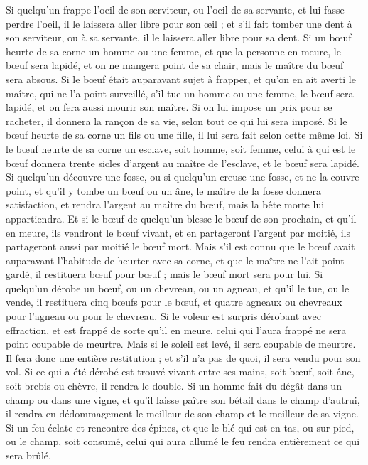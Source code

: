 \begin{multicols}{2}
Si quelqu'un frappe l'oeil de son serviteur, ou l'oeil de sa servante, et lui fasse perdre l'oeil, il le laissera aller libre pour son œil ;
et s'il fait tomber une dent à son serviteur, ou à sa servante, il le laissera aller libre pour sa dent.
Si un bœuf heurte de sa corne un homme ou une femme, et que la personne en meure, le bœuf sera lapidé, et on ne mangera point de sa chair, mais le maître du bœuf sera absous.
Si le bœuf était auparavant sujet à frapper, et qu’on en ait averti le maître, qui ne l'a point surveillé, s'il tue un homme ou une femme, le bœuf sera lapidé, et on fera aussi mourir son maître.
Si on lui impose un prix pour se racheter, il donnera la rançon de sa vie, selon tout ce qui lui sera imposé.
Si le bœuf heurte de sa corne un fils ou une fille, il lui sera fait selon cette même loi.
Si le bœuf heurte de sa corne un esclave, soit homme, soit femme, celui à qui est le bœuf donnera trente sicles d'argent au maître de l'esclave, et le bœuf sera lapidé.
Si quelqu'un découvre une fosse, ou si quelqu'un creuse une fosse, et ne la couvre point, et qu'il y tombe un bœuf ou un âne,
le maître de la fosse donnera satisfaction, et rendra l'argent au maître du bœuf, mais la bête morte lui appartiendra.
Et si le bœuf de quelqu'un blesse le bœuf de son prochain, et qu'il en meure, ils vendront le bœuf vivant, et en partageront l'argent par moitié, ils partageront aussi par moitié le bœuf mort.
Mais s'il est connu que le bœuf avait auparavant l’habitude de heurter avec sa corne, et que le maître ne l'ait point gardé, il restituera bœuf pour bœuf ; mais le bœuf mort sera pour lui.
\VerseOne{}Si quelqu'un dérobe un bœuf, ou un chevreau, ou un agneau, et qu'il le tue, ou le vende, il restituera cinq bœufs pour le bœuf, et quatre agneaux ou chevreaux pour l'agneau ou pour le chevreau.
Si le voleur est surpris dérobant avec effraction, et est frappé de sorte qu'il en meure, celui qui l'aura frappé ne sera point coupable de meurtre.
Mais si le soleil est levé, il sera coupable de meurtre. Il fera donc une entière restitution ; et s'il n'a pas de quoi, il sera vendu pour son vol.
Si ce qui a été dérobé est trouvé vivant entre ses mains, soit bœuf, soit âne, soit brebis ou chèvre, il rendra le double.
Si un homme fait du dégât dans un champ ou dans une vigne, et qu’il laisse paître son bétail dans le champ d’autrui, il rendra en dédommagement le meilleur de son champ et le meilleur de sa vigne.
Si un feu éclate et rencontre des épines, et que le blé qui est en tas, ou sur pied, ou le champ, soit consumé, celui qui aura allumé le feu rendra entièrement ce qui sera brûlé.

\end{multicols}
